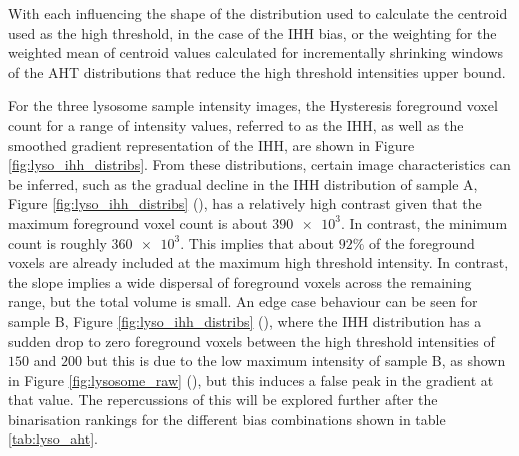 With each influencing the shape of the distribution used to calculate the centroid used as the high threshold, in the case of the IHH bias, or the weighting for the weighted mean of centroid values calculated for incrementally shrinking windows of the AHT distributions that reduce the high threshold intensities upper bound.\par For the three lysosome sample intensity images, the Hysteresis foreground voxel count for a range of intensity values, referred to as the IHH, as well as the smoothed gradient representation of the IHH, are shown in Figure \ref{fig:lyso_ihh_distribs}. From these distributions, certain image characteristics can be inferred, such as the gradual decline in the IHH distribution of sample A, Figure \ref{fig:lyso_ihh_distribs} (), has a relatively high contrast given that the maximum foreground voxel count is about $\num{390e3}$. In contrast, the minimum count is roughly $\num{360e3}$. This implies that about $92\%$ of the foreground voxels are already included at the maximum high threshold intensity. In contrast, the slope implies a wide dispersal of foreground voxels across the remaining range, but the total volume is small. An edge case behaviour can be seen for sample B, Figure \ref{fig:lyso_ihh_distribs} (),  where the IHH distribution has a sudden drop to zero foreground voxels between the high threshold intensities of $150$ and $200$ but this is due to the low maximum intensity of sample B, as shown in Figure \ref{fig:lysosome_raw} (), but this induces a false peak in the gradient at that value. The repercussions of this will be explored further after the binarisation rankings for the different bias combinations shown in table \ref{tab:lyso_aht}.


